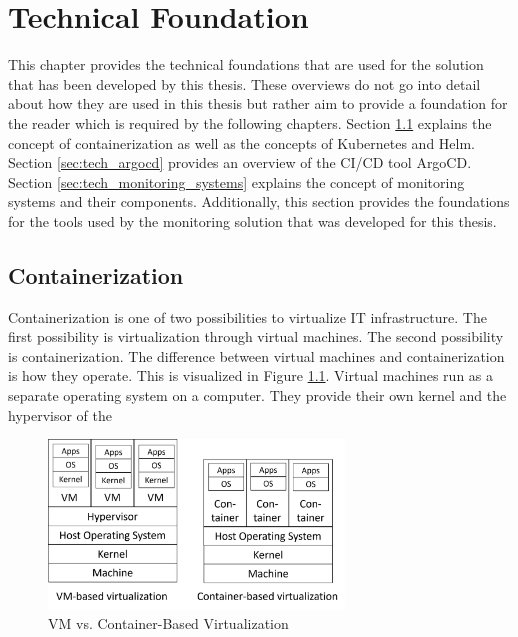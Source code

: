 \chapter{Technical Foundation}
\label{cha:technical_foundation}

This chapter provides the technical foundations that are used for the solution that has been developed by this thesis.
These overviews do not go into detail about how they are used in this thesis but rather aim to provide
a foundation for the reader which is required by the following chapters.
Section \ref{sec:tech_containerization} explains the concept of containerization as well as the concepts of Kubernetes and Helm.
Section \ref{sec:tech_argocd} provides an overview of the CI/CD tool ArgoCD.
Section \ref{sec:tech_monitoring_systems} explains the concept of monitoring systems and their components. Additionally,
this section provides the foundations for the tools used by the monitoring solution that was developed for this thesis.

\section{Containerization}
\label{sec:tech_containerization}


Containerization is one of two possibilities to virtualize IT infrastructure.
The first possibility is virtualization through virtual machines.
The second possibility is containerization. The difference between virtual machines
and containerization is how they operate. This is visualized in Figure \ref{fig:vm_container_virtualization}.
Virtual machines run as a separate operating system on a computer.
They provide their own kernel and the hypervisor of the

\cite{DOC-DOCS}

\cite{KUB-DOCS}

\cite{HEL-DOCS}


\begin{figure}
	\centering
	\includegraphics[width=0.7\textwidth]{figures/vm_container_virtualization.png}
	\caption{VM vs. Container-Based Virtualization \cite{CM-W-CON}}
	\label{fig:vm_container_virtualization}
\end{figure}

